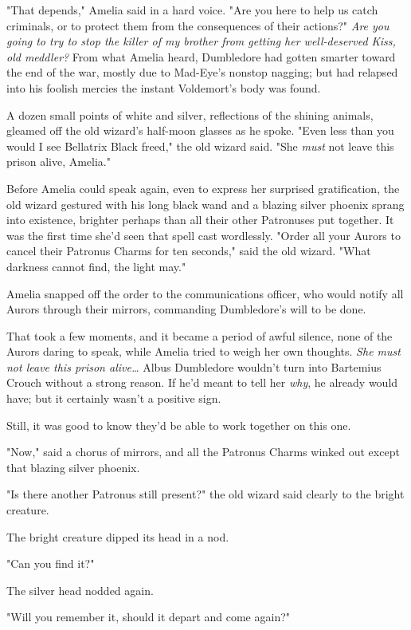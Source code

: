 "That depends," Amelia said in a hard voice. "Are you here to help us catch 
criminals, or to protect them from the consequences of their actions?" 
\emph{Are you going to try to stop the killer of my brother from getting her 
well-deserved Kiss, old meddler?} From what Amelia heard, Dumbledore had gotten 
smarter toward the end of the war, mostly due to Mad-Eye's nonstop nagging; but 
had relapsed into his foolish mercies the instant Voldemort's body was found.

A dozen small points of white and silver, reflections of the shining animals, 
gleamed off the old wizard's half-moon glasses as he spoke. "Even less than you 
would I see Bellatrix Black freed," the old wizard said. "She \emph{must} not 
leave this prison alive, Amelia."

Before Amelia could speak again, even to express her surprised gratification, 
the old wizard gestured with his long black wand and a blazing silver phoenix 
sprang into existence, brighter perhaps than all their other Patronuses put 
together. It was the first time she'd seen that spell cast wordlessly. "Order 
all your Aurors to cancel their Patronus Charms for ten seconds," said the old 
wizard. "What darkness cannot find, the light may."

Amelia snapped off the order to the communications officer, who would notify 
all Aurors through their mirrors, commanding Dumbledore's will to be done.

That took a few moments, and it became a period of awful silence, none of the 
Aurors daring to speak, while Amelia tried to weigh her own thoughts. \emph{She 
must not leave this prison alive{\ldots}} Albus Dumbledore wouldn't turn into 
Bartemius Crouch without a strong reason. If he'd meant to tell her \emph{why}, 
he already would have; but it certainly wasn't a positive sign.

Still, it was good to know they'd be able to work together on this one.

"Now," said a chorus of mirrors, and all the Patronus Charms winked out except 
that blazing silver phoenix.

"Is there another Patronus still present?" the old wizard said clearly to the 
bright creature.

The bright creature dipped its head in a nod.

"Can you find it?"

The silver head nodded again.

"Will you remember it, should it depart and come again?"


